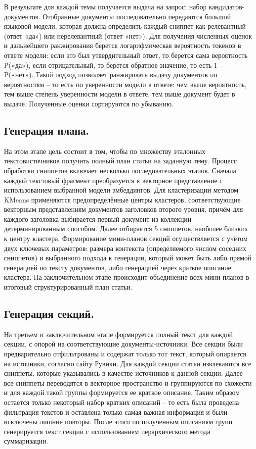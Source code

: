 \documentclass{article}
\theoremstyle{definition}
\theoremstyle{plain}
\begin{document}
В результате для каждой темы получается выдача на запрос: набор кандидатов-документов. Отобранные документы последовательно передаются большой языковой модели, которая должна определить каждый сниппет как релевантный (ответ «да») или нерелевантный (ответ «нет»). 
Для получения численных оценок и дальнейшего ранжирования берется логарифмическая вероятность токенов в ответе модели: если это был утвердительный ответ, то берется сама вероятность P(«да»), если отрицательный, то берется обратное значение, то есть 1 – P(«нет»). 
Такой подход позволяет ранжировать выдачу документов по вероятностям – то есть по уверенности модели в ответе: чем выше вероятность, тем выше степень уверенности модели в ответе, тем выше документ будет в выдаче. Полученные оценки сортируются по убыванию. 

\subsection*{Генерация плана.}

На этом этапе цель состоит в том, чтобы по множеству эталонных текстов\-источников получить полный план статьи на заданную тему.
Процесс обработки сниппетов включает несколько последовательных этапов. 
Сначала каждый текстовый фрагмент преобразуется в векторное представление с использованием выбранной модели эмбеддингов. 
Для кластеризации методом KMeans применяются предопределённые центры кластеров, соответствующие векторным представлениям документов заголовков второго уровня, причём для каждого заголовка выбирается первый документ из коллекции детерминированным способом. 
Далее отбирается 5 сниппетов, наиболее близких к центру кластера.  Формирование мини-планов секций осуществляется с учётом двух ключевых параметров: размера контекста (определяемого числом соседних сниппетов) и выбранного подхода к генерации, который может быть либо прямой генерацией по тексту документов, либо генерацией через краткое описание кластера. 
На заключительном этапе происходит объединение всех мини-планов в итоговый структурированный план статьи.

\subsection*{Генерация секций.}
На третьем и заключительном этапе формируется полный текст для каждой секции, с опорой на соответствующие документы-источники.
Все секции были предварительно отфильтрованы и содержат только тот текст, который опирается на источники, согласно сайту Рувики. 
Для каждой секции статьи извлекаются все сниппеты, которые указывались в качестве источников к данной секции. 
Далее все сниппеты переводятся в векторное пространство и группируются по схожести и для каждой такой группы формируется ее краткое описание.
Таким образом остается только некоторый набор кратких описаний – то есть была проведена фильтрация текстов и оставлена только самая важная информация и были исключены лишние повторы. 
После этого по полученным описаниям групп генерируется текст секции с использованием иерархического метода суммаризации.
\end{document}
